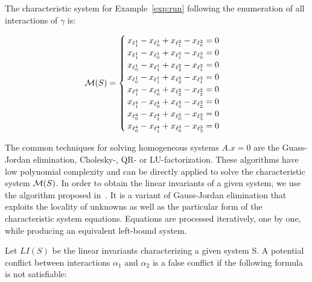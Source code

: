 \begin{example}
  The characteristic system for Example~\ref{exp:run} following the enumeration of all 
  interactions of $\gamma$ is:

  \[\mathcal{M}(S)=\begin{cases}
    x_{\ell_1^1}-x_{\ell_0^1}+x_{\ell_1^2}-x_{\ell_0^2}=0\\ 
    x_{\ell_1^1}-x_{\ell_0^1}+x_{\ell_1^3}-x_{\ell_0^3}=0\\ 
    x_{\ell_0^1}-x_{\ell_1^1}+x_{\ell_2^2}-x_{\ell_1^2}=0\\ 
    x_{\ell_0^1}-x_{\ell_1^1}+x_{\ell_2^3}-x_{\ell_1^3}=0\\ 
    x_{\ell_1^4}-x_{\ell_0^4}+x_{\ell_3^2}-x_{\ell_2^2}=0\\ 
    x_{\ell_1^4}-x_{\ell_0^4}+x_{\ell_3^3}-x_{\ell_2^3}=0\\ 
    x_{\ell_0^4}-x_{\ell_1^4}+x_{\ell_0^2}-x_{\ell_3^2}=0\\ 
    x_{\ell_0^4}-x_{\ell_1^4}+x_{\ell_0^3}-x_{\ell_3^3}=0\\ 
  
  
  \end{cases}\]

\end{example}

The common techniques for solving homogeneous systems $A.x=0$ are the Guass-Jordan elimination,
Cholesky-, QR- or LU-factorization. These algorithms have low polynomial complexity and
can be directly applied to solve the characteristic system $\mathcal{M}(S)$.
In order to obtain the linear invariants of a given system, we use the algorithm 
proposed in~\cite{inv-lin}. It is a variant of Gauss-Jordan elimination that exploits 
the locality of unknowns as well as the particular form of the characteristic system equations. 
Equations are processed iteratively, one by one, while producing an equivalent left-bound system.

Let $LI(S)$ be the linear invariants characterizing a given system S.
A potential conflict between interactions $\alpha_1$ and $\alpha_2$ is a false conflict if the 
following formula is not satisfiable:

